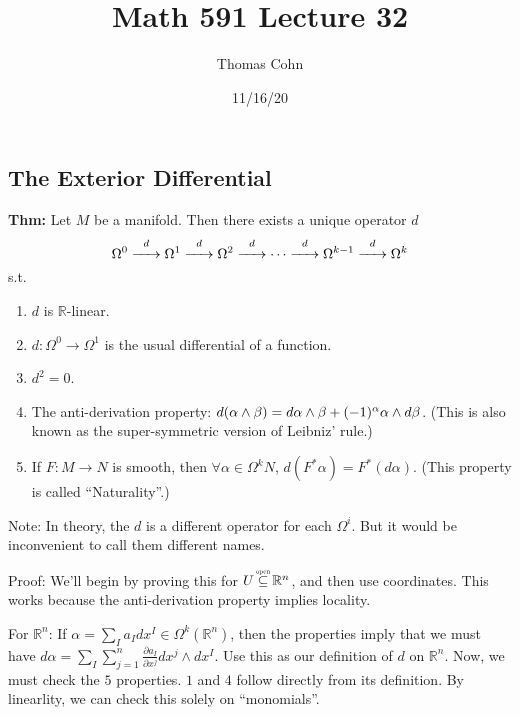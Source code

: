 \documentclass[10pt,letterpaper]{article}
\author{Thomas Cohn}
\title{Math 591 Lecture 32}
\date{11/16/20} %
\newcommand{\n}{\hfill\break}
\newcommand{\up}{\vspace{-\baselineskip}}
\newcommand{\hangblock}[2]{\par\noindent\settowidth{\hangindent}{\textbf{#1: }}\textbf{#1: }\nolinebreak#2}
\newcommand{\thm}[1]{\hangblock{Thm}{#1}}
\newcommand{\ptxt}[1]{\textrm{\textnormal{#1}}}
\newcommand{\reals}{\mathbb{R}}
\newcommand{\R}{\reals}
\newcommand{\osubseteq}{\overset{\mathclap{\scalebox{0.5}{\ptxt{open}}}}{\subseteq}}
\let\deg\relax
\DeclareMathOperator{\deg}{deg}
\newcommand{\pd}[2]{\frac{\partial{}#1}{\partial{}#2}}
\newcommand{\st}{s.t.}
\begin{document}
\maketitle
\setlength\RaggedRightParindent{\parindent}
\RaggedRight

\subsection*{The Exterior Differential}

\thm{
	Let $M$ be a manifold. Then there exists a unique operator $d$
	\[
		\Omega^{0}\overset{d}{\xrightarrow{\hspace{0.5cm}}}\Omega^{1}\overset{d}{\xrightarrow{\hspace{0.5cm}}}\Omega^{2}\overset{d}{\xrightarrow{\hspace{0.5cm}}}\cdots\overset{d}{\xrightarrow{\hspace{0.5cm}}}\Omega^{k-1}\overset{d}{\xrightarrow{\hspace{0.5cm}}}\Omega^{k}
	\]
	\st{}
	\begin{enumerate}[itemsep=0pt, topsep=0pt, leftmargin=4\parindent, label=(\arabic*)]
		\item $d$ is $\R$-linear.
		\item $d:\Omega^{0}\to\Omega^{1}$ is the usual differential of a function.
		\item $d^{2}=0$.
		\item The anti-derivation property: $d(\alpha\wedge\beta)=d\alpha\wedge\beta+(-1)^{\deg\alpha}\alpha\wedge{}d\beta$. (This is also known as the super-symmetric version of Leibniz' rule.)
		\item If $F:M\to{}N$ is smooth, then $\forall\alpha\in\Omega^{k}N$, $d(F^{*}\alpha)=F^{*}(d\alpha)$. (This property is called ``Naturality''.)
	\end{enumerate}\up\n
}

\par\noindent
Note: In theory, the $d$ is a different operator for each $\Omega^{i}$. But it would be inconvenient to call them different names.\n

\par\noindent
Proof: We'll begin by proving this for $U\osubseteq\R^{n}$, and then use coordinates. This works because the anti-derivation property implies locality.\n

\par\noindent
For $\R^{n}$: If $\displaystyle\alpha=\sum_{I}a_{I}dx^{I}\in\Omega^{k}(\R^{n})$, then the properties imply that we must have $\displaystyle{}d\alpha=\sum_{I}\sum_{j=1}^{n}\pd{a_{I}}{x^{j}}dx^{j}\wedge{}dx^{I}$.\n
Use this as our definition of $d$ on $\R^{n}$. Now, we must check the $5$ properties. $1$ and $4$ follow directly from its definition. By linearlity, we can check this solely on ``monomials''.\n
\end{document}
